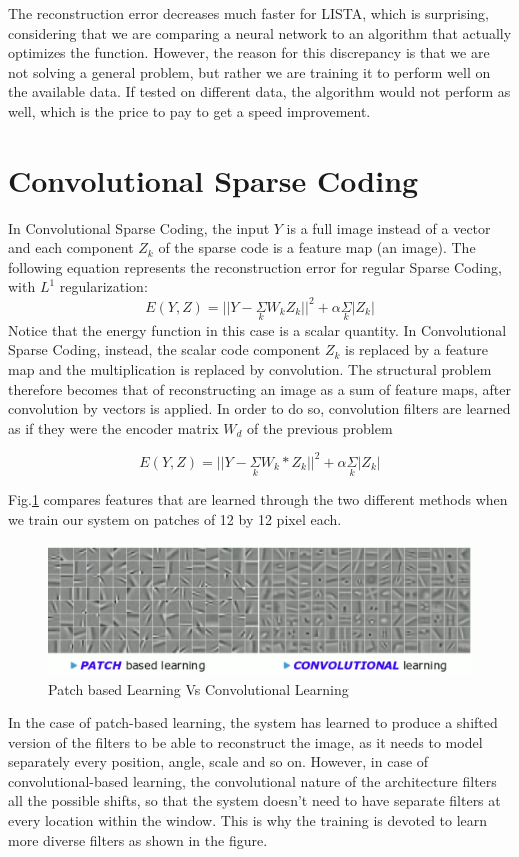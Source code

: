 \documentclass[12pt,letterpaper]{article}
\begin{document}
The reconstruction error decreases much faster for LISTA, which is surprising, considering that we are comparing a neural network to an algorithm that actually optimizes the function. However, the reason for this discrepancy is that we are not solving a general problem, but rather we are training it to perform well on the available data. If tested on different data, the algorithm would not perform as well, which is the price to pay to get a speed improvement. 

\section*{Convolutional Sparse Coding} 
In Convolutional Sparse Coding, the input $Y$ is a full image instead of a vector and each component $Z_k$ of the sparse code is a feature map (an image). The following equation represents the reconstruction error for regular Sparse Coding, with $L^1$ regularization:
\[E(Y,Z) = ||Y - \underset{k}{\Sigma} W_k Z_k||^2 + \alpha \underset{k}{\Sigma}|Z_k|\]
Notice that the energy function in this case is a scalar quantity. In Convolutional Sparse Coding, instead, the scalar code component $Z_k$ is replaced by a feature map and the multiplication is replaced by convolution. The structural problem therefore becomes that of reconstructing an image as a sum of feature maps, after convolution by vectors is applied. In order to do so, convolution filters are learned as if they were the encoder matrix $W_d$ of the previous problem

\[E(Y,Z) = ||Y - \underset{k}{\Sigma} W_k * Z_k||^2 + \alpha \underset{k}{\Sigma}|Z_k|\]

Fig.\ref{fig:PATCHvCONV} compares features that are learned through the two different methods when we train our system on patches of 12 by 12 pixel each.
\begin{figure}[H]
  \includegraphics[width=\linewidth]{PATCHvCONV.jpg}
  \caption{Patch based Learning Vs Convolutional Learning}
  \label{fig:PATCHvCONV}
\end{figure}
In the case of patch-based learning, the system has learned to produce a shifted version of the filters to be able to reconstruct the image, as it needs to model separately every position, angle, scale and so on. However, in case of convolutional-based learning, the convolutional nature of the architecture filters all the possible shifts, so that the system doesn't need to have separate filters at every location within the window. This is why the training is devoted to learn more diverse filters as shown in the figure.\\
\\
\end{document}
